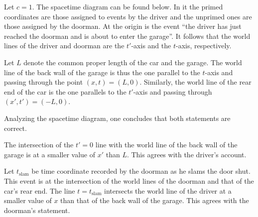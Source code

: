 \begin{solution}

Let $c=1$. The spacetime diagram can be found below. In it the primed coordinates are those assigned to events by the driver and the unprimed ones are those assigned by the doorman. At the origin is the event ``the driver has just reached the doorman and is about to enter the garage''. It follows that the world lines of the driver and doorman are the $t'$-axis and the $t$-axis, respectively.

Let $L$ denote the common proper length of the car and the garage. The world line of the back wall of the garage is thus the one parallel to the $t$-axis and passing through the point $(x,t)=(L,0)$. Similarly, the world line of the rear end of the car is the one parallels to the $t'$-axis and passing through $(x',t')=(-L,0)$.

\begin{paracol}{2}
    \begin{center}
    \end{center}
    \switchcolumn
    Analyzing the spacetime diagram, one concludes that both statements are correct.

    The intersection of the $t' = 0$ line with the world line of the back wall of the garage is at a smaller value of $x'$ than $L$. This agrees with the driver's account.
        
    Let $t_\text{slam}$ be time coordinate recorded by the doorman as he slams the door shut. This event is at the intersection of the world lines of the doorman and that of the car's rear end. The line $t = t_\text{slam}$ intersects the world line of the driver at a smaller value of $x$ than that of the back wall of the garage. This agrees with the doorman's statement.
\end{paracol}


\end{solution}
